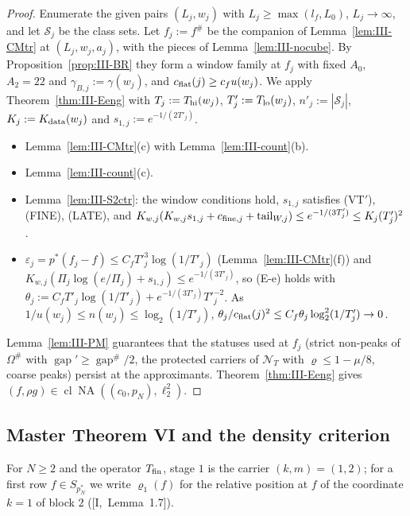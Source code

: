 \documentclass[10pt]{amsart}
\theoremstyle{definition}
\theoremstyle{remark}
\newcommand{\NA}{\operatorname{NA}}
\newcommand{\cl}{\operatorname{cl}}
\newcommand{\gap}{\operatorname{gap}}
\begin{document}
\begin{proof}
Enumerate the given pairs $(L_j,w_j)$ with $L_j\ge\max(l_f,L_0)$, $L_j\to\infty$,
and let $\mathcal S_j$ be the class sets.  Let $f_j:=f^\#$ be the companion of
Lemma~\ref{lem:III-CMtr} at $(L_j,w_j,a_j)$, with the pieces of
Lemma~\ref{lem:III-nocube}.  By Proposition~\ref{prop:III-BR} they form a window
family at $f_j$ with fixed $A_0$, $A_2=22$ and $\gamma_{B,j}:=\gamma(w_j)$, and
$c_{\rm flat}(j)\ge c_fu(w_j)$.  We apply Theorem~\ref{thm:III-Eeng} with
$T_j:=T_{\rm hi}(w_j)$, $T'_j:=T_{\rm lo}(w_j)$, $n'_j:=|\mathcal S_j|$,
$K_j:=K_{\rm data}(w_j)$ and $s_{1,j}:=e^{-1/(2T'_j)}$.
\begin{itemize}
\item[(E-c)] Lemma~\ref{lem:III-CMtr}(c) with Lemma~\ref{lem:III-count}(b).
\item[(E-d)] Lemma~\ref{lem:III-count}(c).
\item[(E-f)] Lemma~\ref{lem:III-S2ctr}: the window conditions hold, $s_{1,j}$
satisfies (VT$'$), (FINE), (LATE), and $K_{w,j}(K_{w,j}s_{1,j}+c_{{\rm fine},j}+
\mathrm{tail}_{W,j})\le e^{-1/(3T'_j)}\le K_j(T'_j)^2$.
\item[(E-e)] $\varepsilon_j=p^*(f_j-f)\le C_fT'^3_j\log(1/T'_j)$
(Lemma~\ref{lem:III-CMtr}(f)) and $K_{w,j}(\Pi_j\log(e/\Pi_j)+s_{1,j})\le
e^{-1/(3T'_j)}$, so (E-e) holds with $\theta_j:=C_fT'_j\log(1/T'_j)+
e^{-1/(3T'_j)}T'^{-2}_j$.  As $1/u(w_j)\le n(w_j)\le\log_2(1/T'_j)$,
$\theta_j/c_{\rm flat}(j)^2\le C_f\theta_j\log_2^2(1/T'_j)\to0$.
\end{itemize}
Lemma~\ref{lem:III-PM} guarantees that the statuses used at $f_j$ (strict
non-peaks of $\Omega^\#$ with $\gap'\ge\gap^\#/2$, the protected carriers of
$\mathcal N_T$ with $\varrho\le1-\mu/8$, coarse peaks) persist at the
approximants.  Theorem~\ref{thm:III-Eeng} gives $(f,\rho g)\in\cl\NA((c_0,p_N),
\ell_2^2)$.
\end{proof}

\subsection{Master Theorem VI and the density criterion}\label{subsec:III-MTVI}

For $N\ge2$ and the operator $T_{\rm fin}$, stage $1$ is the carrier $(k,m)=(1,2)$;
for a first row $f\in S_{p_N^*}$ we write $\varrho_1(f)$ for the relative
position at $f$ of the coordinate $k=1$ of block $2$ ([I,~Lemma~1.7]).
\end{document}
